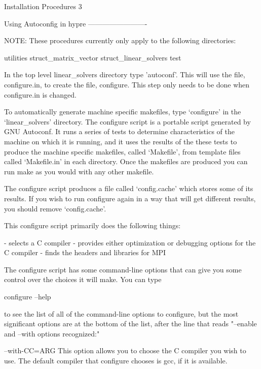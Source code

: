 \documentclass{article}
\begin{document}
\begin{cxxentry}
{}
        {Installation Procedures}
        {}
        {}
        {3}
\begin{cxxdoc}


Using Autoconfig in hypre
-------------------------

NOTE: These procedures currently only apply to the following directories:

utilities
\newline
struct_matrix_vector
\newline
struct_linear_solvers
\newline
test
\newline

In the top level linear_solvers directory type 'autoconf'.  This will use the file, configure.in, to create the file, configure.  This step only needs to be done when configure.in is changed.  

To automatically generate machine specific makefiles, type `configure'
in the `linear_solvers' directory.  The configure script is a portable
script generated by GNU Autoconf.  It runs a series of tests to
determine characteristics of the machine on which it is running, and
it uses the results of the these tests to produce the machine specific
makefiles, called `Makefile', from template files called `Makefile.in'
in each directory.  Once the makefiles are produced you can run make
as you would with any other makefile.

The configure script produces a file called `config.cache' which
stores some of its results.  If you wish to run configure again in a
way that will get different results, you should remove `config.cache'.

This configure script primarily does the following things:

- selects a C compiler
- provides either optimization or debugging options for the C compiler
- finds the headers and libraries for MPI

The configure script has some command-line options that can give you
some control over the choices it will make.  You can type

configure --help

to see the list of all of the command-line options to configure, but
the most significant options are at the bottom of the list, after the
line that reads "--enable and --with options recognized:"

--with-CC=ARG		
This option allows you to choose the C compiler
you wish to use.  The default compiler that
configure chooses is gcc, if it is available.


\end{cxxdoc}
\end{cxxentry}
\end{document}
